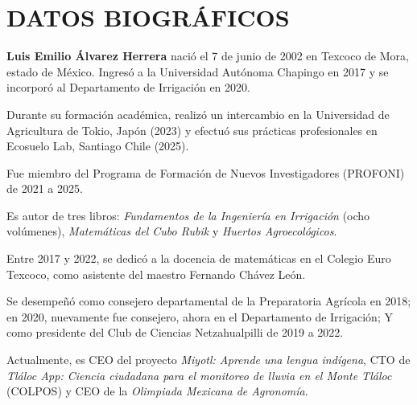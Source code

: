 

\chapter*{DATOS BIOGRÁFICOS}

\textbf{Luis Emilio Álvarez Herrera} nació el 7 de junio de 2002 en Texcoco de Mora, estado de México. Ingresó a la Universidad Autónoma Chapingo en 2017 y se incorporó al Departamento de Irrigación en 2020.

Durante su formación académica, realizó un intercambio en la Universidad de Agricultura de Tokio, Japón (2023) y efectuó sus prácticas profesionales en Ecosuelo Lab, Santiago Chile (2025).

Fue miembro del Programa de Formación de Nuevos Investigadores (PROFONI) de 2021 a 2025. 

Es autor de tres libros: \textit{Fundamentos de la Ingeniería en Irrigación} (ocho volúmenes), \textit{Matemáticas del Cubo Rubik} y \textit{Huertos Agroecológicos}.

Entre 2017 y 2022, se dedicó a la docencia de matemáticas en el Colegio Euro Texcoco, como asistente del maestro Fernando Chávez León. 

Se desempeñó como consejero departamental de la Preparatoria Agrícola en 2018; en 2020, nuevamente fue consejero, ahora en el Departamento de Irrigación; Y como presidente del Club de Ciencias Netzahualpilli de 2019 a 2022. 

Actualmente, es CEO del proyecto \textit{Miyotl: Aprende una lengua indígena}, CTO de \textit{Tláloc App: Ciencia ciudadana para el monitoreo de lluvia en el Monte Tláloc} (COLPOS) y CEO de la \textit{Olimpiada Mexicana de Agronomía}.



